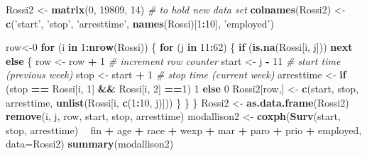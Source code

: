 \documentclass[]{book}
\newenvironment{Shaded}{\begin{snugshade}}{\end{snugshade}}
\newcommand{\CommentTok}[1]{\textcolor[rgb]{0.56,0.35,0.01}{\textit{#1}}}
\newcommand{\ControlFlowTok}[1]{\textcolor[rgb]{0.13,0.29,0.53}{\textbf{#1}}}
\newcommand{\DataTypeTok}[1]{\textcolor[rgb]{0.13,0.29,0.53}{#1}}
\newcommand{\DecValTok}[1]{\textcolor[rgb]{0.00,0.00,0.81}{#1}}
\newcommand{\KeywordTok}[1]{\textcolor[rgb]{0.13,0.29,0.53}{\textbf{#1}}}
\newcommand{\NormalTok}[1]{#1}
\newcommand{\OperatorTok}[1]{\textcolor[rgb]{0.81,0.36,0.00}{\textbf{#1}}}
\newcommand{\StringTok}[1]{\textcolor[rgb]{0.31,0.60,0.02}{#1}}
\begin{document}
\begin{Shaded}
\begin{Highlighting}[]
\NormalTok{Rossi2 <-}\StringTok{ }\KeywordTok{matrix}\NormalTok{(}\DecValTok{0}\NormalTok{, }\DecValTok{19809}\NormalTok{, }\DecValTok{14}\NormalTok{) }\CommentTok{# to hold new data set}
\KeywordTok{colnames}\NormalTok{(Rossi2) <-}\StringTok{ }\KeywordTok{c}\NormalTok{(}\StringTok{'start'}\NormalTok{, }\StringTok{'stop'}\NormalTok{, }\StringTok{'arresttime'}\NormalTok{, }\KeywordTok{names}\NormalTok{(Rossi)[}\DecValTok{1}\OperatorTok{:}\DecValTok{10}\NormalTok{], }\StringTok{'employed'}\NormalTok{)}

\NormalTok{row<-}\DecValTok{0}
\ControlFlowTok{for}\NormalTok{ (i }\ControlFlowTok{in} \DecValTok{1}\OperatorTok{:}\KeywordTok{nrow}\NormalTok{(Rossi)) \{ }
    \ControlFlowTok{for}\NormalTok{ (j }\ControlFlowTok{in} \DecValTok{11}\OperatorTok{:}\DecValTok{62}\NormalTok{) \{ }
        \ControlFlowTok{if}\NormalTok{ (}\KeywordTok{is.na}\NormalTok{(Rossi[i, j])) }\ControlFlowTok{next}
        \ControlFlowTok{else}\NormalTok{ \{}
\NormalTok{            row <-}\StringTok{ }\NormalTok{row }\OperatorTok{+}\StringTok{ }\DecValTok{1} \CommentTok{# increment row counter}
\NormalTok{            start <-}\StringTok{ }\NormalTok{j }\OperatorTok{-}\StringTok{ }\DecValTok{11} \CommentTok{# start time (previous week)}
\NormalTok{            stop <-}\StringTok{ }\NormalTok{start }\OperatorTok{+}\StringTok{ }\DecValTok{1} \CommentTok{# stop time (current week)}
\NormalTok{            arresttime <-}\StringTok{ }\ControlFlowTok{if}\NormalTok{ (stop }\OperatorTok{==}\StringTok{ }\NormalTok{Rossi[i, }\DecValTok{1}\NormalTok{] }\OperatorTok{&&}\StringTok{ }\NormalTok{Rossi[i, }\DecValTok{2}\NormalTok{] }\OperatorTok{==}\DecValTok{1}\NormalTok{) }\DecValTok{1} \ControlFlowTok{else} \DecValTok{0}
\NormalTok{            Rossi2[row,] <-}\StringTok{ }\KeywordTok{c}\NormalTok{(start, stop, arresttime, }\KeywordTok{unlist}\NormalTok{(Rossi[i, }\KeywordTok{c}\NormalTok{(}\DecValTok{1}\OperatorTok{:}\DecValTok{10}\NormalTok{, j)]))}
\NormalTok{            \}}
\NormalTok{        \}}
\NormalTok{\}}
\NormalTok{Rossi2 <-}\StringTok{ }\KeywordTok{as.data.frame}\NormalTok{(Rossi2)}
\KeywordTok{remove}\NormalTok{(i, j, row, start, stop, arresttime)}
\NormalTok{modallison2 <-}\StringTok{ }\KeywordTok{coxph}\NormalTok{(}\KeywordTok{Surv}\NormalTok{(start, stop, arresttime) }\OperatorTok{~}\StringTok{ }\NormalTok{fin }\OperatorTok{+}\StringTok{ }\NormalTok{age }\OperatorTok{+}\StringTok{ }\NormalTok{race }\OperatorTok{+}\StringTok{ }\NormalTok{wexp }\OperatorTok{+}\StringTok{ }\NormalTok{mar }\OperatorTok{+}\StringTok{ }\NormalTok{paro }\OperatorTok{+}\StringTok{ }\NormalTok{prio }\OperatorTok{+}\StringTok{ }\NormalTok{employed, }\DataTypeTok{data=}\NormalTok{Rossi2)}
\KeywordTok{summary}\NormalTok{(modallison2)}
\end{Highlighting}
\end{Shaded}
\end{document}
